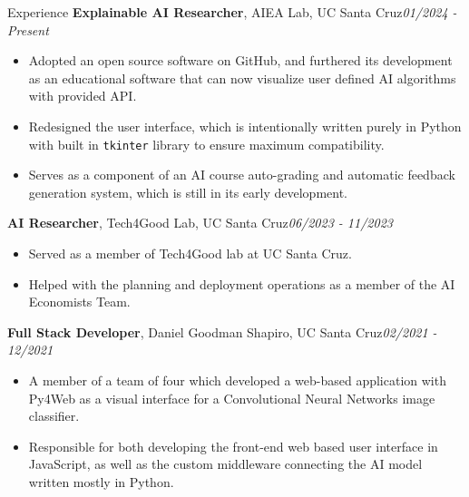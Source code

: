 \documentclass{resume} %
\begin{document}
\begin{rSection}{Experience}
{\bf{Explainable AI Researcher}}{, AIEA Lab, UC Santa Cruz}\hfill{\em 01/2024 - Present} \\
\begin{itemize}
\vspace{-0.7cm}
\item Adopted an open source software on GitHub, and furthered its development as an educational software that can now visualize user defined AI algorithms with provided API.
\vspace{-0.2cm}
\item Redesigned the user interface, which is intentionally written purely in Python with built in \texttt{tkinter} library to ensure maximum compatibility. 
\vspace{-0.2cm}
\item Serves as a component of an AI course auto-grading and automatic feedback generation system, which is still in its early development. 
\end{itemize}

\vspace{-0.2cm}
{\bf{AI Researcher}}{, Tech4Good Lab, UC Santa Cruz}\hfill{\em 06/2023 - 11/2023}
\begin{itemize}
\vspace{-0.2cm}
\item Served as a member of Tech4Good lab at UC Santa Cruz. 
\vspace{-0.2cm}
\item Helped with the planning and deployment operations as a member of the AI Economists Team. 
\end{itemize}

\vspace{-0.2cm}
{\bf{Full Stack Developer}}{, Daniel Goodman Shapiro, UC Santa Cruz}\hfill{\em 02/2021 - 12/2021}
\begin{itemize}
\vspace{-0.2cm}
\item A member of a team of four which developed a web-based application with Py4Web as a visual interface for a Convolutional Neural Networks image classifier. 
\vspace{-0.2cm}
\item Responsible for both developing the front-end web based user interface in JavaScript, as well as the custom middleware connecting the AI model written mostly in Python. 
\end{itemize}


\end{rSection}
\end{document}
